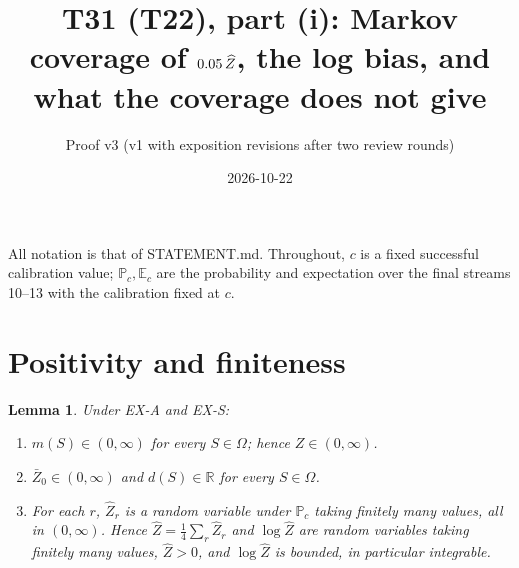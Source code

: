 \documentclass[11pt]{article}
\title{T31 (T22), part (i): Markov coverage of $0.05\,\Zh$, the log bias, and what the coverage does not give}
\author{Proof v3 (v1 with exposition revisions after two review rounds)}
\date{2026-10-22}
\newtheorem{lemma}[theorem]{Lemma}
\theoremstyle{remark}
\newcommand{\Zh}{\widehat Z}
\newcommand{\Pc}{\mathbb{P}_c}
\newcommand{\Ec}{\mathbb{E}_c}
\begin{document}
\maketitle

All notation is that of STATEMENT.md. Throughout, $c$ is a fixed successful calibration value; $\Pc,\Ec$ are the probability
and expectation over the final streams 10--13 with the calibration fixed at $c$.

\section{Positivity and finiteness}

\begin{lemma}\label{lem:pos}
Under EX-A and EX-S:
\begin{enumerate}[label=(\roman*)]
\item $m(S)\in(0,\infty)$ for every $S\in\Omega$; hence $Z\in(0,\infty)$.
\item $\bar Z_0\in(0,\infty)$ and $d(S)\in\mathbb{R}$ for every $S\in\Omega$.
\item For each $r$, $\Zh_r$ is a random variable under $\Pc$ taking finitely many values, all in $(0,\infty)$. Hence
$\Zh=\frac14\sum_r\Zh_r$ and $\log\Zh$ are random variables taking finitely many values, $\Zh>0$, and $\log\Zh$ is
bounded, in particular integrable.
\end{enumerate}
\end{lemma}
\end{document}
